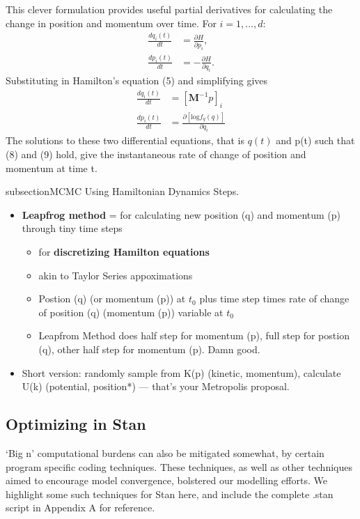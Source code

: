 \documentclass{article}
\begin{document}
This clever formulation provides useful partial derivatives for calculating the change in position and momentum over time. For $i = 1,\dots, d$:
\begin{align}
\frac{d q_{i}(t)}{dt} &= \frac{\partial H}{\partial p_{i}}, \\
\frac{d p_{i}(t)}{dt} &= -\frac{\partial H}{\partial q_{i}}.
\end{align}
Substituting in Hamilton's equation (5) and simplifying gives
\begin{align}
\frac{d q_{i}(t)}{dt} &=  [\pmb{M}^{-1}p]_{i} \\
\frac{d p_{i}(t)}{dt} &= \frac {\partial \left[ \text{log}f_{q}(q) \right]}{\partial q_{i}}
\end{align}
The solutions to these two differential equations, that is $q(t)$ and p(t) such that (8) and (9) hold, give the instantaneous rate of change of position and momentum at time t. 

subsection{MCMC Using Hamiltonian Dynamics \citep{Neal2011}} %
Steps.

\begin{itemize}

\item {\bf Leapfrog method} = for calculating new position (q) and momentum (p) through tiny time steps
  \begin{itemize}
  \item for {\bf discretizing Hamilton equations}
  \item akin to Taylor Series appoximations
  \item Postion (q) (or momentum (p)) at $t_{0}$ plus time step times rate of change of position (q) (momentum (p)) variable at $t_{0}$
  \item Leapfrom Method does half step for momentum (p), full step for postion (q), other half step for momentum (p). Damn good.

  \end{itemize}

\item Short version: randomly sample from K(p) (kinetic, momentum), calculate U(k) (potential, position*) --- that's your Metropolis proposal.
\end{itemize}


\subsection{Optimizing in Stan} %
`Big n' computational burdens can also be mitigated somewhat, by certain program specific coding techniques. These techniques, as well as other techniques aimed to encourage model convergence, bolstered our modelling efforts. We highlight some such techniques for Stan here, and include the complete .stan script in Appendix A for reference. 
\end{document}
